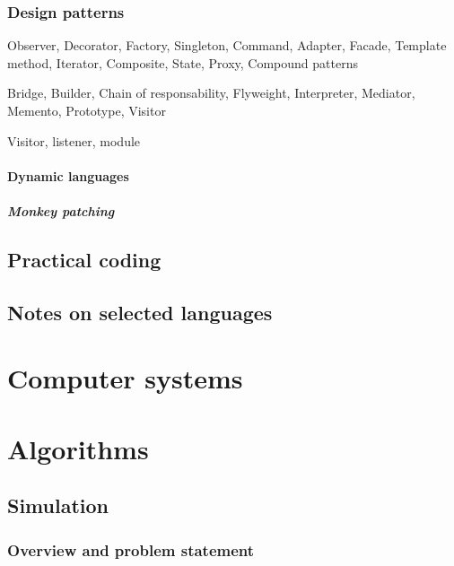 \documentclass{report}
\begin{document}
\section{Design patterns}
Observer, Decorator, Factory, Singleton, Command, Adapter, Facade, Template method, Iterator, Composite, State, Proxy, Compound patterns

Bridge, Builder, Chain of responsability, Flyweight, Interpreter, Mediator, Memento, Prototype, Visitor

Visitor, listener, module
\subsection{Dynamic languages}
\subsubsection{Monkey patching}

\chapter{Practical coding}


\chapter{Notes on selected languages}


\part{Computer systems}
\setcounter{chapter}{0} %


\part{Algorithms}
\setcounter{chapter}{0} %


\chapter{Simulation}
\section{Overview and problem statement}
\end{document}
